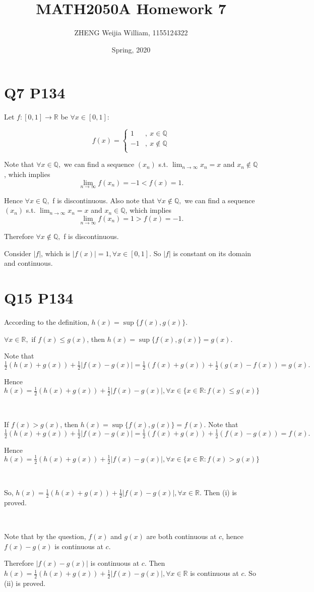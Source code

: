 \documentclass[12pt]{article}%
\begin{document}
\title{MATH2050A Homework 7}
\author{ZHENG Weijia William, 1155124322}
\date{Spring, 2020}
\maketitle


\section{Q7 P134}
Let $f:[0,1] \to \mathbb{R}$ be $\forall x\in [0,1]$:

$$f(x)=\left\{
\begin{aligned}
1 &,~ x\in \mathbb{Q}\\
-1 &, ~x\not\in \mathbb{Q} \\
\end{aligned}
\right.$$

Note that $\forall x\in \mathbb{Q},$ we can find a sequence $(x_n)$ s.t. $\lim_{n \to \infty}x_n = x$ and $x_n \not\in \mathbb{Q}$, which implies $$\lim_{n \to \infty}f(x_n)=-1<f(x)=1.$$ 

Hence $\forall x\in \mathbb{Q},$ f is discontinuous. Also note that $\forall x\not\in \mathbb{Q},$ we can find a sequence $(x_n)$ s.t. $\lim_{n \to \infty}x_n = x$ and $x_n \in \mathbb{Q}$, which implies $$\lim_{n \to \infty}f(x_n)=1>f(x)=-1.$$ 

Therefore $\forall x\not\in \mathbb{Q},$ f is discontinuous.

Consider $|f|$, which is $|f(x)|=1, \forall x\in [0,1].$ So $|f|$ is constant on its domain and continuous. 


\section{Q15 P134}
According to the definition, $h(x)=\sup\{f(x),g(x)\}.$

$\forall x\in \mathbb{R},$ if $f(x)\leq g(x)$, then $h(x)=\sup\{f(x),g(x)\}=g(x).$

Note that $\frac{1}{2}(h(x)+g(x))+\frac{1}{2}|f(x)-g(x)|=\frac{1}{2}(f(x)+g(x))+\frac{1}{2}(g(x)-f(x))=g(x).$

Hence $h(x)=\frac{1}{2}(h(x)+g(x))+\frac{1}{2}|f(x)-g(x)|, \forall x \in \{x\in \mathbb{R}: f(x)\leq g(x)\}$

~

If $f(x)>g(x)$, then $h(x)=\sup\{f(x),g(x)\}=f(x).$ 
Note that $\frac{1}{2}(h(x)+g(x))+\frac{1}{2}|f(x)-g(x)|=\frac{1}{2}(f(x)+g(x))+\frac{1}{2}(f(x)-g(x))=f(x).$

Hence $h(x)=\frac{1}{2}(h(x)+g(x))+\frac{1}{2}|f(x)-g(x)|, \forall x \in \{x\in \mathbb{R}: f(x)>g(x)\}$

~

So, $h(x)=\frac{1}{2}(h(x)+g(x))+\frac{1}{2}|f(x)-g(x)|, \forall x \in \mathbb{R}.$ Then (i) is proved. 


~

Note that by the question, $f(x)$ and $g(x)$ are both continuous at $c$, hence $f(x)-g(x)$ is continuous at $c$. 

Therefore $|f(x)-g(x)|$ is continuous at $c$. Then $h(x)=\frac{1}{2}(h(x)+g(x))+\frac{1}{2}|f(x)-g(x)|, \forall x \in \mathbb{R}$ is continuous at $c$. So (ii) is proved. 
\end{document}
